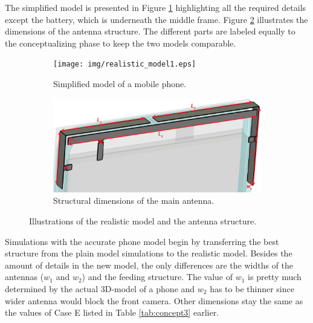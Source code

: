 The simplified model is presented in Figure \ref{fig:realistic_model1} highlighting all the required details except the battery, which is underneath the middle frame. Figure \ref{fig:realistic_model2} illustrates the dimensions of the antenna structure. The different parts are labeled equally to the conceptualizing phase to keep the two models comparable.
\begin{figure}[H]
    \centering
    \begin{subfigure}[b]{0.5\textwidth}
        \texttt{[image: img/realistic\_model1.eps]}
        \caption{Simplified model of a mobile phone.}
        \label{fig:realistic_model1}
    \end{subfigure}

    \begin{subfigure}[b]{0.5\textwidth}
        \includegraphics[width=\textwidth]{img/realistic_model2.eps}
        \caption{Structural dimensions of the main antenna.}
        \label{fig:realistic_model2}
    \end{subfigure}
    \caption{Illustrations of the realistic model and the antenna structure.}
    \label{fig:realistic_model}
    \vspace{-10pt}
\end{figure}

Simulations with the accurate phone model begin by transferring the best structure from the plain model simulations to the realistic model. Besides the amount of details in the new model, the only differences are the widths of the antennas ($w_1$ and $w_2$) and the feeding structure. The value of $w_1$ is pretty much determined by the actual 3D-model of a phone and $w_2$ has to be thinner since wider antenna would block the front camera. Other dimensions stay the same as the values of Case E listed in Table \ref{tab:concept3} earlier.

